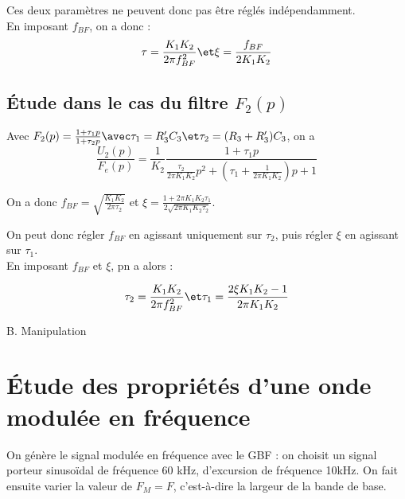 \documentclass[../../Cours_M1.tex]{subfiles}
\begin{document}
Ces deux paramètres ne peuvent donc pas être réglés indépendamment. \\

En imposant $f_{BF}$, on a donc :
\[ \tau = \frac{K_1 K_2}{2\pi f_{BF}^2} \et \xi = \frac{f_{BF}}{2K_1K_2} \]

\subsection{Étude dans le cas du filtre $F_2(p)$}
Avec $F_2(p) = \frac{1+\tau_1 p}{1+\tau_2 p} \avec \tau_1 = R'_3C_3 \et \tau_2 = (R_3+R'_3)C_3$, on a 
\[ \frac{U_2(p)}{F_e(p)} = \frac{1}{K_2} \frac{1+\tau_1 p}{\frac{\tau_2}{2\pi K_1K_2}p^2 + (\tau_1+\frac{1}{2\pi K_1K_2})p+1}\]

On a donc 
$f_{BF} = \sqrt{\frac{K_1 K_2}{2\pi \tau_2}}$ et $\xi = \frac{1+2\pi K_1 K_2 \tau_1}{2\sqrt{2\pi K_1 K_2 \tau_2}}$.

On peut donc régler $f_{BF}$ en agissant uniquement sur $\tau_2$, puis régler $\xi$ en agissant sur $\tau_1$.\\

En imposant $f_{BF}$ et $\xi$, pn a alors :

\[ \tau_2 = \frac{K_1K_2}{2\pi f_{BF}^2} \et \tau_1 = \frac{2\xi K_1 K_2 - 1}{2\pi K_1 K_2} \]

\newpage
\begin{center}
\begin{Large}
B. Manipulation
\end{Large}
\end{center}
\setcounter{section}{0}

\section{Étude des propriétés d'une onde modulée en fréquence}

On génère le signal modulée en fréquence avec le GBF : on choisit un signal porteur sinusoïdal de fréquence 60 kHz, d'excursion de fréquence 10kHz. On fait ensuite varier la valeur de $F_M=F$, c'est-à-dire la largeur de la bande de base.
\end{document}
